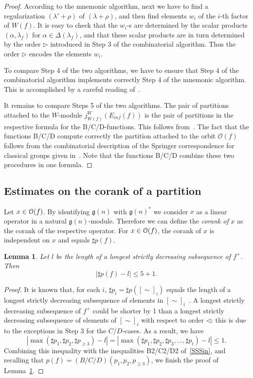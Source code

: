 \documentclass{emsprocart}
\newtheorem{lemma}[theorem]{Lemma}
\begin{document}
\begin{proof}
According to the mnemonic algorithm, next we have to find a regularization $(\lambda'+\rho)$ of $(\lambda+\rho)$, and then find elements $w_i$ of the $i$-th factor of $W(f)$. It is easy to check that the $w_i$-s are determined by the scalar products $(\alpha, \lambda_f)$ for $\alpha\in\Delta(\lambda_f)$, and that these scalar products are in turn determined by the order $\triangleright$ introduced in Step 3 of the combinatorial algorithm. Thus the order $\triangleright$ encodes the elements $w_i$.

To compare Step 4 of the two algorithms, we have to ensure that Step 4 of the combinatorial algorithm implements correctly Step 4 of the mnemonic algorithm. This is accomplished by a careful reading of~\cite[Section: The Robinson-Schensted Algorithm for Classical Groups]{Barbasch-Vogan}.

It remains to compare Steps 5 of the two algorithms. The pair of partitions attached to the $W$-module $j_{W(f)}^W(E_{inf}(f))$ is the pair of partitions in the respective formula for the B/C/D-functions. This follows from~\cite{Lusztig}. The fact that the functions B/C/D compute correctly the partition attached to the orbit $\mathcal O(f)$ follows from the combinatorial description of the Springer correspondence for classical groups given in~\cite{Barbasch-Vogan}. Note that the functions B/C/D combine these two procedures in one formula.

\end{proof}

\subsection{Estimates on the corank of a partition}\label{SSSrrsa} Let $x\in\EuScript O(f)$. By identifying $\mathfrak g(n)$ with $\mathfrak g(n)^*$ we consider $x$ as a linear operator in a natural $\mathfrak g(n)$-module. Therefore we can define the {\it corank of} $x$ as the corank of the respective operator. For $x\in\EuScript O(f)$, the corank of $x$ is independent on $x$ and equals $\sharp p(f)$. %

\begin{lemma}\label{Lfcrk}Let $l$ be the length of a longest strictly decreasing subsequence of $f^+$. Then $$|\sharp p(f)-l|\le 5+1.$$\end{lemma}
\begin{proof}
It is known that, for each $i$, $\sharp p_i=\sharp p([\sim]_i)$ equals the length of a longest strictly decreasing subsequence of elements in $[\sim]_i$~\cite[p. 69, Ex. 7]{Knu}. A longest strictly decreasing subsequence of $f^+$ 
could be shorter by 1 than a longest strictly decreasing subsequence of elements of $[\sim]_i$ with respect to order $\triangleleft$: this is due to the exceptions in Step 3 for the $C/D$-cases. As a result, we have $$|\max(\sharp p_1, \sharp p_2, \sharp p_{\ge3})-l|=|\max(\sharp p_1, \sharp p_2, \sharp p_3,..., \sharp p_t)-l|\le1.$$
Combining this inequality with the inequalities B2/C2/D2 of~\ref{SSSin}, and recalling that $p(f)=(B/C/D)(p_1, p_2, p_{\ge3})$, we finish the proof of Lemma~\ref{Lfcrk}.
\end{proof}
\end{document}
